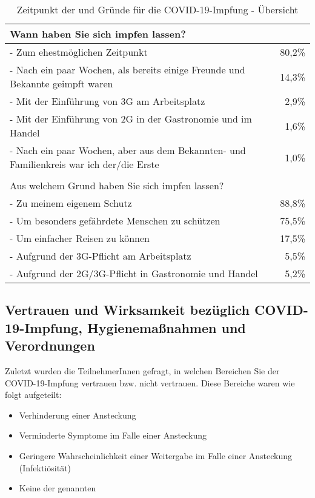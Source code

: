 \begin{table}[h!]
    \centering
    \begin{tabular} {p{} r}
        Wann haben Sie sich impfen lassen? & \\
        \hline

        - Zum ehestmöglichen Zeitpunkt & 80,2\% \\

        - Nach ein paar Wochen, als bereits einige Freunde und Bekannte geimpft waren & 14,3\% \\

        - Mit der Einführung von 3G am Arbeitsplatz & 2,9\% \\

        - Mit der Einführung von 2G in der Gastronomie und im Handel & 1,6\% \\

        - Nach ein paar Wochen, aber aus dem Bekannten- und Familienkreis war ich der/die Erste & 1,0\% \\ \\

        Aus welchem Grund haben Sie sich impfen lassen? & \\
        \hline

        - Zu meinem eigenem Schutz & 88,8\% \\

        - Um besonders gefährdete Menschen zu schützen & 75,5\% \\

        - Um einfacher Reisen zu können & 17,5\% \\

        - Aufgrund der 3G-Pflicht am Arbeitsplatz & 5,5\% \\

        - Aufgrund der 2G/3G-Pflicht in Gastronomie und Handel & 5,2\% \\
    \end{tabular}
    \caption{Zeitpunkt der und Gründe für die COVID-19-Impfung - Übersicht}
    \label{tab:gruende}
\end{table}

\subsection{Vertrauen und Wirksamkeit bezüglich COVID-19-Impfung, Hygienemaßnahmen und Verordnungen}

Zuletzt wurden die TeilnehmerInnen gefragt, in welchen Bereichen Sie der COVID-19-Impfung vertrauen bzw. nicht vertrauen. Diese Bereiche waren wie folgt aufgeteilt:
\begin{itemize}
    \item Verhinderung einer Ansteckung
    \item Verminderte Symptome im Falle einer Ansteckung
    \item Geringere Wahrscheinlichkeit einer Weitergabe im Falle einer Ansteckung (Infektiösität)
    \item Keine der genannten
\end{itemize}

